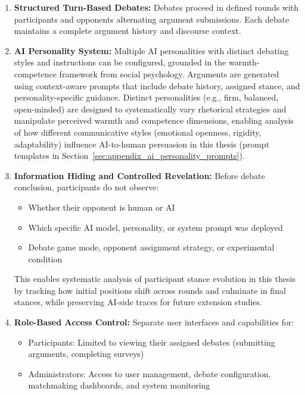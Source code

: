 \begin{enumerate}
    \item \textbf{Structured Turn-Based Debates:} Debates proceed in defined rounds with
    participants and opponents alternating argument submissions. Each debate maintains a
    complete argument history and discourse context.

    \item \textbf{AI Personality System:} Multiple AI personalities with distinct debating styles
    and instructions can be configured, grounded in the warmth-competence framework from social
    psychology. Arguments are generated using context-aware prompts that include debate history,
    assigned stance, and personality-specific guidance. Distinct personalities (e.g.,
    firm, balanced, open-minded) are designed to systematically vary rhetorical strategies and
    manipulate perceived warmth and competence dimensions, enabling analysis of how different
    communicative styles (emotional openness, rigidity, adaptability) influence AI-to-human persuasion
    in this thesis (prompt templates in Section~\ref{sec:appendix_ai_personality_prompts}).

    \item \textbf{Information Hiding and Controlled Revelation:} Before debate conclusion,
    participants do not observe:
    \begin{itemize}
        \item Whether their opponent is human or AI
        \item Which specific AI model, personality, or system prompt was deployed
        \item Debate game mode, opponent assignment strategy, or experimental condition
    \end{itemize}
    This enables systematic analysis of participant stance evolution in this thesis by tracking
    how initial positions shift across rounds and culminate in final stances, while preserving
    AI-side traces for future extension studies.

    \item \textbf{Role-Based Access Control:} Separate user interfaces and capabilities for:
    \begin{itemize}
        \item Participants: Limited to viewing their assigned debates (submitting arguments, completing surveys)
        \item Administrators: Access to user management, debate configuration, matchmaking
        dashboards, and system monitoring
    \end{itemize}


\end{enumerate}
